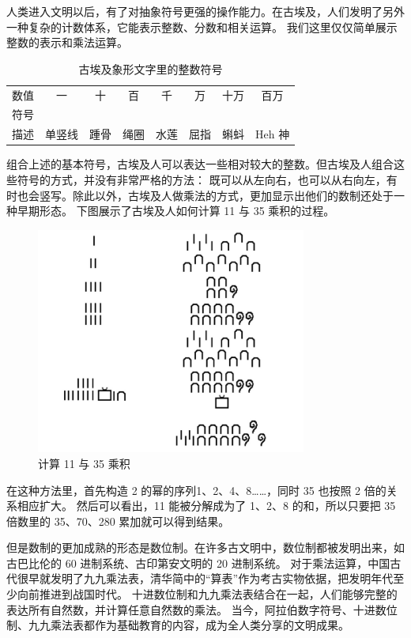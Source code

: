 \documentclass[a4paper,10.5pt]{article}
\begin{document}
人类进入文明以后，有了对抽象符号更强的操作能力。在古埃及，人们发明了另外一种复杂的计数体系，它能表示整数、分数和相关运算。
我们这里仅仅简单展示整数的表示和乘法运算。

\begin{table}[tbhp]
\centering
\begin{tabular}{|c|ccccccc|}
\hline
数值 & 一 & 十 & 百 & 千 & 万 & 十万 & 百万 \\
符号 & \pmglyph{\Hone} & \pmglyph{\Hten} & \pmglyph{\Hhundred} & \pmglyph{\Hthousand} & \pmglyph{\HXthousand} & \pmglyph{\HCthousand} & \pmglyph{\Hmillion} \\
描述 & 单竖线 & 踵骨 & 绳圈 & 水莲 & 屈指 & 蝌蚪 & Heh 神\\
\hline
\end{tabular}
\caption{古埃及象形文字里的整数符号}
\end{table}

组合上述的基本符号，古埃及人可以表达一些相对较大的整数。但古埃及人组合这些符号的方式，并没有非常严格的方法：
既可以从左向右，也可以从右向左，有时也会竖写。除此以外，古埃及人做乘法的方式，更加显示出他们的数制还处于一种早期形态。
下图展示了古埃及人如何计算 11 与 35 乘积的过程。

\begin{figure}[ht]
\centering
\includegraphics[width=3.5in]{images/ancient_egypt_multiplication.jpg}
\caption{计算 11 与 35 乘积}
\end{figure}

在这种方法里，首先构造 2 的幂的序列1、2、4、8……，同时 35 也按照 2 倍的关系相应扩大。
然后可以看出，11 能被分解成为了 1、2、8 的和，所以只要把 35 倍数里的 35、70、280 累加就可以得到结果。

但是数制的更加成熟的形态是数位制。在许多古文明中，数位制都被发明出来，如古巴比伦的 60 进制系统、古印第安文明的 20 进制系统。
对于乘法运算，中国古代很早就发明了九九乘法表，清华简中的“算表”作为考古实物依据，把发明年代至少向前推进到战国时代。
十进数位制和九九乘法表结合在一起，人们能够完整的表达所有自然数，并计算任意自然数的乘法。
当今，阿拉伯数字符号、十进数位制、九九乘法表都作为基础教育的内容，成为全人类分享的文明成果。
\end{document}
